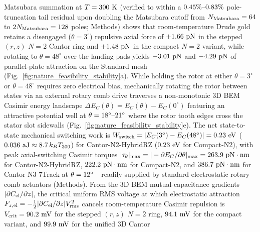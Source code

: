 \documentclass[pdflatex,sn-nature]{sn-jnl}
\DeclareRobustCommand{\roundone}[1]{\fpeval{round(#1,1)}}
\DeclareRobustCommand{\roundtwo}[1]{\fpeval{round(#1,2)}}
\DeclareRobustCommand{\roundthree}[1]{\fpeval{round(#1,3)}}
\begin{document}
Matsubara summation at $T = 300{}\text{ K}$ (verified to within a $\roundtwo{\BemValMatsubaraCantorThetathreeTailRelPct}\%\text{--}\roundtwo{\BemValMatsubaraCantorThetafoureightTailRelPct}\%$ pole-truncation tail residual upon doubling the Matsubara cutoff from $N_{\rm Matsubara} = 64{}$ to $2N_{\rm Matsubara} = 128{}$ poles; Methods) shows that room-temperature Drude gold retains a disengaged ($\theta=3^\circ$) repulsive axial force of $+\roundtwo{\NatureCantorNtwoHybridrzPatchPotentialFCasimirGoldThreezerozerokPn}\text{ pN}$ in the stepped $(r,z)$ $N=2$ Cantor ring and $+\roundtwo{\NatureRotCeightCompactNtwoPatchPotentialFCasimirGoldThreezerozerokPn}\text{ pN}$ in the compact $N=2$ variant, while rotating to $\theta=48^\circ$ over the landing pads yields $\roundtwo{\NatureCantorNtwoHybridrzStepfiveForceZPn}\text{ pN}$ and $\roundtwo{\NatureRotCeightCompactNtwoSteptwooneForceZPn}\text{ pN}$ of parallel-plate attraction on the Standard mesh (Fig.~\ref{fig:nature_feasibility_stability}a). While holding the rotor at either $\theta = 3^\circ$ or $\theta = 48^\circ$ requires zero electrical bias, mechanically rotating the rotor between states via an external rotary comb drive traverses a non-monotonic 3D BEM Casimir energy landscape $\Delta E_C(\theta) = E_C(\theta) - E_C(0^\circ)$ featuring an attractive potential well at $\theta = 18{}^\circ\text{--}21^\circ$ where the rotor tooth edges cross the stator slot sidewalls (Fig.~\ref{fig:nature_feasibility_stability}e). The net state-to-state mechanical switching work is $W_{\rm switch} = |E_C(3^\circ) - E_C(48^\circ)| = \roundtwo{\NatureCantorNtwoHybridrzRotationalEnergyBarrierSwitchingWorkEv}\text{ eV}$ ($\roundthree{\NatureCantorNtwoHybridrzRotationalEnergyBarrierSwitchingWorkAj}\text{ aJ} \approx \roundone{\NatureCantorNtwoHybridrzRotationalEnergyBarrierSwitchingWorkOverKbtthreezerozero}\,k_B T_{300}$) for Cantor-N2-HybridRZ ($\roundtwo{\NatureRotCeightCompactNtwoRotationalEnergyBarrierSwitchingWorkEv}\text{ eV}$ for Compact-N2), with peak axial-switching Casimir torques $|\tau_\theta|_{\max} = |-\partial E_C/\partial\theta|_{\max} = \roundone{\NatureCantorNtwoHybridrzPeakTorquePnNm}\text{ pN}\cdot\text{nm}$ for Cantor-N2-HybridRZ, $\roundone{\NatureRotCeightCompactNtwoPeakTorquePnNm}\text{ pN}\cdot\text{nm}$ for Compact-N2, and $\roundone{\NatureFractalNthreeCantorseventrackPeakTorquePnNm}\text{ pN}\cdot\text{nm}$ for Cantor-N3-7Track at $\theta = 12{}^\circ$---readily supplied by standard electrostatic rotary comb actuators (Methods). From the 3D BEM mutual-capacitance gradients $|\partial C_{\rm el}/\partial z|$, the critical uniform RMS voltage at which electrostatic attraction $F_{z,\rm el} = -\frac{1}{2}|\partial C_{\rm el}/\partial z|V_{\rm rms}^2$ cancels room-temperature Casimir repulsion is $V_{\rm crit} = \roundone{\NatureCantorNtwoHybridrzPatchPotentialVCritMv}\text{ mV}$ for the stepped $(r,z)$ $N=2$ ring, $\roundone{\NatureRotCeightCompactNtwoPatchPotentialVCritMv}\text{ mV}$ for the compact variant, and $\roundone{\NatureFthreeOneoneoneVCritMv}\text{ mV}$ for the unified 3D Cantor 
\end{document}
